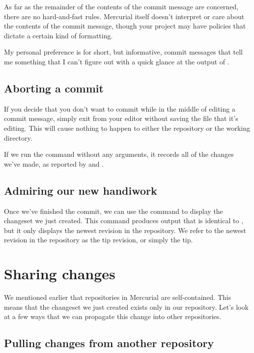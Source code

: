 As far as the remainder of the contents of the commit message are
concerned, there are no hard-and-fast rules.  Mercurial itself doesn't
interpret or care about the contents of the commit message, though
your project may have policies that dictate a certain kind of
formatting.

My personal preference is for short, but informative, commit messages
that tell me something that I can't figure out with a quick glance at
the output of .

\subsection{Aborting a commit}

If you decide that you don't want to commit while in the middle of
editing a commit message, simply exit from your editor without saving
the file that it's editing.  This will cause nothing to happen to
either the repository or the working directory.

If we run the  command without any arguments, it records
all of the changes we've made, as reported by  and
.

\subsection{Admiring our new handiwork}

Once we've finished the commit, we can use the  command to
display the changeset we just created.  This command produces output
that is identical to , but it only displays the newest
revision in the repository.
We refer to the newest revision in the repository as the tip revision,
or simply the tip.

\section{Sharing changes}

We mentioned earlier that repositories in Mercurial are
self-contained.  This means that the changeset we just created exists
only in our  repository.  Let's look at a few ways
that we can propagate this change into other repositories.

\subsection{Pulling changes from another repository}
\label{sec:tour:pull}

